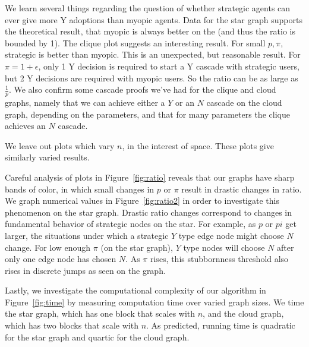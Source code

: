 \documentclass{article}
\begin{document}
We learn several things regarding the question of whether strategic agents can ever give more Y adoptions than myopic agents. Data for the star graph supports the theoretical result, that myopic is always better on the (and thus the ratio is bounded by 1). The clique plot suggests an interesting result. For small $p, \pi$, strategic is better than myopic. This is an unexpected, but reasonable result. For $\pi=1+\epsilon$, only 1 Y decision is required to start a Y cascade with strategic users, but 2 Y decisions are required with myopic users. So the ratio can be as large as $\frac{1}{p}$. We also confirm some cascade proofs we've had for the clique and cloud graphs, namely that we can achieve either a $Y$ or an $N$ cascade on the cloud graph, depending on the parameters, and that for many parameters the clique achieves an $N$ cascade.

We leave out plots which vary $n$, in the interest of space. These plots give similarly varied results.

Careful analysis of plots in Figure~\ref{fig:ratio} reveals that our graphs have sharp bands of color, in which small changes in $p$ or $\pi$ result in drastic changes in ratio. We graph numerical values in Figure~\ref{fig:ratio2} in order to investigate this phenomenon on the star graph. Drastic ratio changes correspond to changes in fundamental behavior of strategic nodes on the star. For example, as $p$ or $pi$ get larger, the situations under which a strategic $Y$ type edge node might choose $N$ change. For low enough $\pi$ (on the star graph), $Y$ type nodes will choose $N$ after only one edge node has chosen $N$. As $\pi$ rises, this stubbornness threshold also rises in discrete jumps as seen on the graph.

Lastly, we investigate the computational complexity of our algorithm in Figure~\ref{fig:time} by measuring computation time over varied graph sizes. We time the star graph, which has one block that scales with $n$, and the cloud graph, which has two blocks that scale with $n$. As predicted, running time is quadratic for the star graph and quartic for the cloud graph.
\end{document}
